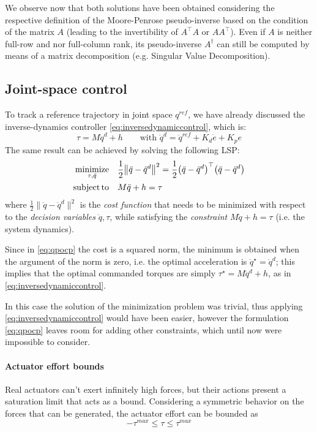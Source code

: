 	We observe now that both solutions have been obtained considering the respective definition of the Moore-Penrose pseudo-inverse based on the condition of the matrix $A$ (leading to the invertibility of $A^\top A$ or $A A^\top$). 
	Even if $A$ is neither full-row and nor full-column rank, its pseudo-inverse $A^\dagger$ can still be computed by means of a matrix decomposition (e.g. Singular Value Decomposition).
	

	
\subsection{Joint-space control}
	To track a reference trajectory in joint space $q^{ref}$, we have already discussed the inverse-dynamics controller \eqref{eq:inversedynamiccontrol}, which is:
	\[ \tau = M \ddot q^d + h \qquad\textrm{with } \ddot q^d = \ddot q^{ref} + K_d \dot e + K_p e \]
	The same result can be achieved by solving the following LSP:
	\begin{equation} \label{eq:qpocp}
	\begin{split}
		\operatorname*{minimize}_{\tau, \ddot q}\quad & \frac 1 2 \big\|\ddot q - \ddot q^d \big\|^2 = \frac 1 2 \big(\ddot q - \ddot q^d\big)^\top \big(\ddot q - \ddot q^d\big) \\
		\operatorname*{subject\,to} \quad & M \ddot q + h = \tau
	\end{split}
	\end{equation}
	where $\frac 1 2 \big\|\ddot q - \ddot q^d \big\|^2$ is the \textit{cost function} that needs to be minimized with respect to the \textit{decision variables} $\ddot q, \tau$, while satisfying the \textit{constraint} $M\ddot q + h = \tau$ (i.e. the system dynamics).
	
	Since in \eqref{eq:qpocp} the cost is a squared norm, the minimum is obtained when the argument of the norm is zero, i.e. the optimal acceleration is $\ddot q^\star = \ddot q^d$; this implies that the optimal commanded torques are simply $\tau^\star = M \ddot q^d + h$, as in \eqref{eq:inversedynamiccontrol}.
	
	In this case the solution of the minimization problem was trivial, thus applying \eqref{eq:inversedynamiccontrol} would have been easier, however the formulation \eqref{eq:qpocp} leaves room for adding other constraints, which until now were impossible to consider. 
		
	\paragraph{Actuator effort bounds} Real actuators can't exert infinitely high forces, but their actions present a saturation limit that acts as a bound. Considering a symmetric behavior on the forces that can be generated, the actuator effort can be bounded as
	\[ -\tau^{max} \leq \tau \leq \tau^{max} \]
	
